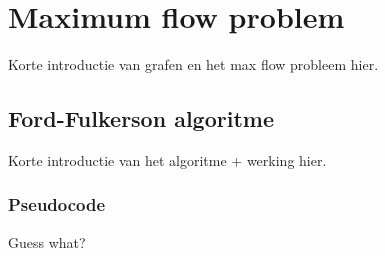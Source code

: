 \chapter{Maximum flow problem}
\label{chap:maxFlowProblem}
Korte introductie van grafen en het max flow probleem hier.

\section{Ford-Fulkerson algoritme}

Korte introductie van het algoritme + werking hier.

\subsection{Pseudocode}

Guess what?